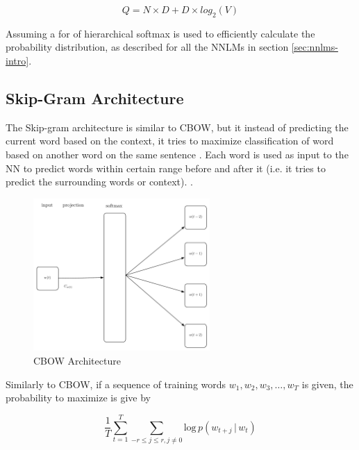 \begin{equation}
  Q = N \times D + D \times  log_2(V)
\end{equation}

Assuming a for of hierarchical softmax is used to efficiently calculate the
probability distribution, as described for all the \ac{NNLM}s in section \ref{sec:nnlms-intro}.


\subsection{Skip-Gram Architecture}
\label{sec:skip-gram-architecture}

The Skip-gram architecture is similar to \ac{CBOW}, but it instead of
predicting the current word based on the context, it tries to maximize
classification of word based on another word on the same sentence
\cite{DBLP:journals/corr/abs-1301-3781}.  Each  word is used as input
to the \ac{NN} to predict words within certain range before and after 
it (i.e. it tries to predict the surrounding words or context). 
\cite{DBLP:journals/corr/abs-1301-3781}. 


\begin{figure}[hptb!]
    \centering
    \includegraphics[width=0.6\textwidth]{images/word2vec-skipgram-latex.pdf} 
    \caption{CBOW Architecture}
    \label{fig:skipgram-architecture-alone}
\end{figure}



Similarly to  \ac{CBOW}, if a sequence of training words $w_1,w_2,w_3,
\dots, w_T$ is given, the probability to maximize is give by


 \begin{equation}
  \label{eq:sumprob-cbow}
   \frac{1}{T} \sum^{T}_{t=1}{\sum_{-r \leq j \leq r, j \neq 0}\text{log} \, p
     \left( w_{t+j} \, |\, w_t  \right)}
\end{equation}

